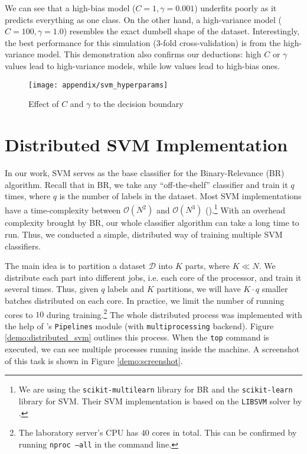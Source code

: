 \par We can see that a high-bias model ($C=1, \gamma=0.001$) underfits poorly
as it predicts everything as one class. On the other hand, a high-variance
model ($C=100, \gamma=1.0$) resembles the exact dumbell shape of the dataset.
Interestingly, the best performance for this simulation (3-fold
cross-validation) is from the high-variance model. This demonstration also
confirms our deductions: high $C$ or $\gamma$ values lead to high-variance models,
while low values lead to high-bias ones.


\begin{figure}[t]
  \centering
    \texttt{[image: appendix/svm\_hyperparams]}
    \caption{Effect of $C$ and $\gamma$ to the decision boundary}
  \label{demo:svm_hyperparams}
\end{figure}

\section{Distributed SVM Implementation}

\par In our work, SVM serves as the base classifier for the Binary-Relevance
(BR) algorithm. Recall that in BR, we take any ``off-the-shelf'' classifier and
train it $q$ times, where $q$ is the number of labels in the dataset. Most SVM
implementations have a time-complexity between $\mathcal{O}(N^2)$ and
$\mathcal{O}(N^3)$ (\cite{bottou2006support}).\footnote{We are using the
    \texttt{scikit-multilearn} library for BR and the \texttt{scikit-learn}
    library for SVM. Their SVM implementation is based on the \texttt{LIBSVM}
    solver by \cite{chang2011libsvm}.} 
With an overhead complexity brought by BR, our whole classifier algorithm can
take a long time to run.  Thus, we conducted a simple, distributed way of
training multiple SVM classifiers.

\par The main idea is to partition a dataset $\mathcal{D}$ into $K$ parts,
where $K \ll N$. We distribute each part into different jobs, i.e. each core of
the processor, and train it several times. Thus, given $q$ labels and $K$
partitions, we will have $K\cdot q$ smaller batches distributed on each core.
In practice, we limit the number of running cores to $10$ during
training.\footnote{The laboratory server's CPU has $40$ cores in total. This
can be confirmed by running \texttt{nproc --all} in the command line.} The
whole distributed process was implemented with the help of
\cite{varoquaux2010pipelines}'s \texttt{Pipelines} module (with
\texttt{multiprocessing} backend). Figure \ref{demo:distributed_svm} outlines
this process. When the \texttt{top} command is executed, we can see multiple
processes running inside the machine. A screenshot of this task is shown in
Figure \ref{demo:screenshot}.

